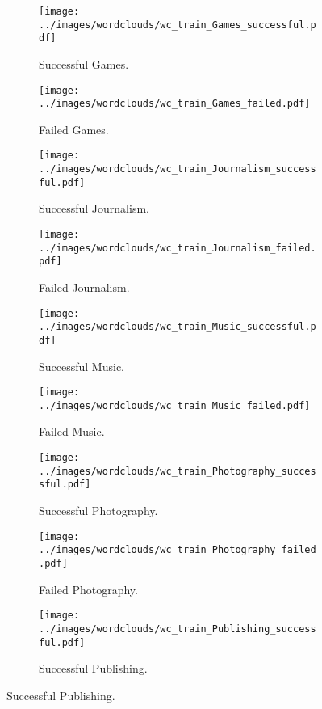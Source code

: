 \documentclass{article}
\begin{document}
\begin{itemize}
\begin{figure}
\begin{subfigure}[i]{0.2\linewidth}
    \centering\texttt{[image: ../images/wordclouds/wc\_train\_Games\_successful.pdf]}
    \caption{Successful Games.}
    \label{fig:Games_s}
  \end{subfigure} 
  \begin{subfigure}[i']{0.2\linewidth}
    \centering\texttt{[image: ../images/wordclouds/wc\_train\_Games\_failed.pdf]}
    \caption{Failed Games.}
    \label{fig:Games_f}
  \end{subfigure}
  \begin{subfigure}[j]{0.2\linewidth}
    \centering\texttt{[image: ../images/wordclouds/wc\_train\_Journalism\_successful.pdf]}
    \caption{Successful Journalism.}
    \label{fig:Journalism_s}
  \end{subfigure} 
  \begin{subfigure}[j']{0.2\linewidth}
    \centering\texttt{[image: ../images/wordclouds/wc\_train\_Journalism\_failed.pdf]}
    \caption{Failed Journalism.}
    \label{fig:Journalism_f}
  \end{subfigure}
  \begin{subfigure}[k]{0.2\linewidth}
    \centering\texttt{[image: ../images/wordclouds/wc\_train\_Music\_successful.pdf]}
    \caption{Successful Music.}
    \label{fig:Music_s}
  \end{subfigure} 
  \begin{subfigure}[k']{0.2\linewidth}
    \centering\texttt{[image: ../images/wordclouds/wc\_train\_Music\_failed.pdf]}
    \caption{Failed Music.}
    \label{fig:Music_f}
  \end{subfigure}
  \begin{subfigure}[l]{0.2\linewidth}
    \centering\texttt{[image: ../images/wordclouds/wc\_train\_Photography\_successful.pdf]}
    \caption{Successful Photography.}
    \label{fig:Photography_s}
  \end{subfigure} 
  \begin{subfigure}[l']{0.2\linewidth}
    \centering\texttt{[image: ../images/wordclouds/wc\_train\_Photography\_failed.pdf]}
    \caption{Failed Photography.}
    \label{fig:Photography_f}
  \end{subfigure}
    \begin{subfigure}[m]{0.2\linewidth}
    \centering\texttt{[image: ../images/wordclouds/wc\_train\_Publishing\_successful.pdf]}
    \caption{Successful Publishing.}
    \label{fig:Publishing_s}
  \end{subfigure} 

\end{figure}
\end{itemize}
\end{document}
